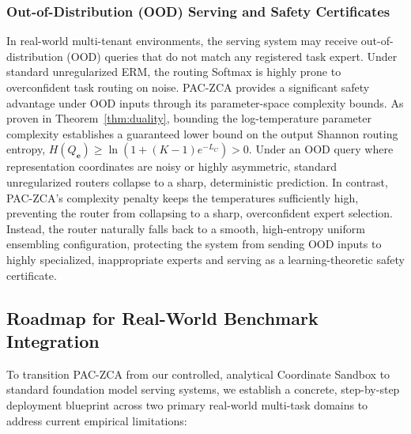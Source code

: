 \subsubsection{Out-of-Distribution (OOD) Serving and Safety Certificates}
In real-world multi-tenant environments, the serving system may receive out-of-distribution (OOD) queries that do not match any registered task expert. Under standard unregularized ERM, the routing Softmax is highly prone to overconfident task routing on noise. PAC-ZCA provides a significant safety advantage under OOD inputs through its parameter-space complexity bounds. 
As proven in Theorem~\ref{thm:duality}, bounding the log-temperature parameter complexity establishes a guaranteed lower bound on the output Shannon routing entropy, $H(Q_{\mathbf{e}}) \ge \ln(1 + (K-1)e^{-L_C}) > 0$. Under an OOD query where representation coordinates are noisy or highly asymmetric, standard unregularized routers collapse to a sharp, deterministic prediction. In contrast, PAC-ZCA's complexity penalty keeps the temperatures sufficiently high, preventing the router from collapsing to a sharp, overconfident expert selection. Instead, the router naturally falls back to a smooth, high-entropy uniform ensembling configuration, protecting the system from sending OOD inputs to highly specialized, inappropriate experts and serving as a learning-theoretic safety certificate.

\subsection{Roadmap for Real-World Benchmark Integration}
To transition PAC-ZCA from our controlled, analytical Coordinate Sandbox to standard foundation model serving systems, we establish a concrete, step-by-step deployment blueprint across two primary real-world multi-task domains to address current empirical limitations:

